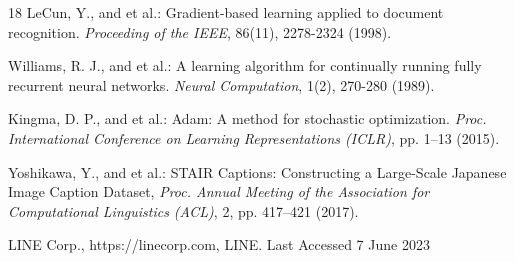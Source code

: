 \documentclass[runningheads]{llncs}
\begin{document}
\begin{thebibliography}{18}
LeCun, Y., and et al.: Gradient-based learning applied to document recognition. {\it Proceeding of the IEEE}, 86(11), 2278-2324 (1998).

Williams, R. J., and et al.: A learning algorithm for continually running fully recurrent neural networks. {\it Neural Computation}, 1(2), 270-280 (1989).

Kingma, D. P., and et al.: Adam: A method for stochastic optimization. {\it Proc. International Conference on Learning Representations (ICLR)}, pp. 1–13 (2015).

Yoshikawa, Y., and et al.: STAIR Captions: Constructing a Large-Scale Japanese Image Caption Dataset, {\it Proc. Annual Meeting of the Association for Computational Linguistics (ACL)}, 2, pp. 417–421 (2017).

LINE Corp., https://linecorp.com, LINE. Last Accessed 7 June 2023

\end{thebibliography}
\end{document}
